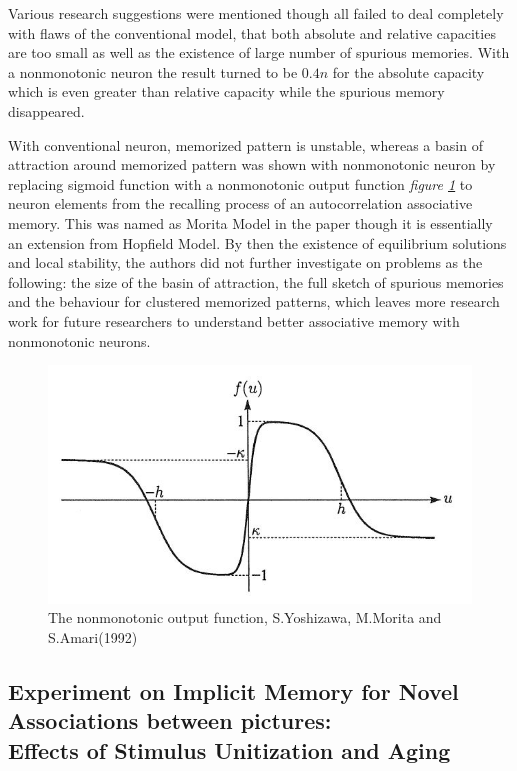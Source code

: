 Various research suggestions were mentioned though all failed to deal completely with flaws of the conventional model, that both absolute and relative capacities are too small as well as the existence of large number of spurious memories. With a nonmonotonic neuron the result turned to be $0.4n$ for the absolute capacity which is even greater than relative capacity while the spurious memory disappeared.

With conventional neuron, memorized pattern is unstable, whereas a basin of attraction around memorized pattern was shown with nonmonotonic neuron by replacing sigmoid function with a nonmonotonic output function \textit{figure \ref{fig:nonmonotonic}} to neuron elements from the recalling process of an autocorrelation associative memory. This was named as Morita Model in the paper though it is essentially an extension from Hopfield Model.
By then the existence of equilibrium solutions and local stability, the authors did not further investigate on problems as the following: the size of the basin of attraction, the full sketch of spurious memories and the behaviour for clustered memorized patterns, which leaves more research work for future researchers to understand better associative memory with nonmonotonic neurons.

\begin{figure}[htbp]
	\centering
	\includegraphics[scale = 0.8]{inc/nonmonotonic.jpg}
	\caption{The nonmonotonic output function, S.Yoshizawa, M.Morita and S.Amari(1992)}
	\label{fig:nonmonotonic}
\end{figure}

\subsection{Experiment on Implicit Memory for Novel Associations between pictures: \\ Effects of Stimulus Unitization and Aging\cite{stimulus_unitization_and_aging}}

